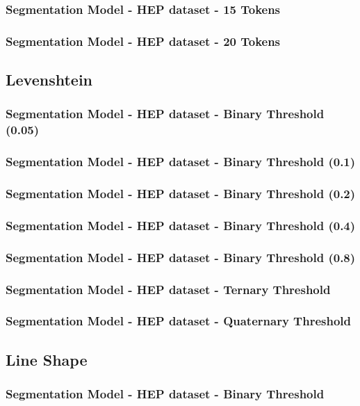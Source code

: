 \documentclass[10pt, oneside]{scrartcl}   	%
\begin{document}
\subsubsection{Segmentation Model - HEP dataset - 15 Tokens}
\subsubsection{Segmentation Model - HEP dataset - 20 Tokens}
\subsection{Levenshtein}
\subsubsection{Segmentation Model - HEP dataset - Binary Threshold (0.05)}
\subsubsection{Segmentation Model - HEP dataset - Binary Threshold (0.1)}
\subsubsection{Segmentation Model - HEP dataset - Binary Threshold (0.2)}
\subsubsection{Segmentation Model - HEP dataset - Binary Threshold (0.4)}
\subsubsection{Segmentation Model - HEP dataset - Binary Threshold (0.8)}
\subsubsection{Segmentation Model - HEP dataset - Ternary Threshold}
\subsubsection{Segmentation Model - HEP dataset - Quaternary Threshold}
\subsection{Line Shape}
\subsubsection{Segmentation Model - HEP dataset - Binary Threshold}
\end{document}
